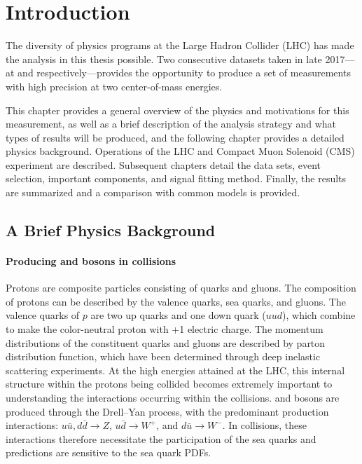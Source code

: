 \chapter{Introduction}

The diversity of physics programs at the Large Hadron Collider (LHC) has made the analysis in this thesis possible. Two consecutive datasets taken in late 2017---at \serag and \serah respectively---provides the opportunity to produce a set of measurements with high precision at two center-of-mass energies.

This chapter provides a general overview of the physics and motivations for this measurement, as well as a brief description of the analysis strategy and what types of results will be produced, and the following chapter provides a detailed physics background. Operations of the LHC and Compact Muon Solenoid (CMS) experiment are described. Subsequent chapters detail the data sets, event selection, important components, and signal fitting method. Finally, the results are summarized and a comparison with common models is provided.


\section{A Brief Physics Background}

\subsubsection{Producing \W and \Z bosons in \pp collisions}
Protons are composite particles consisting of quarks and gluons. The composition of protons can be described by the valence quarks, sea quarks, and gluons. The valence quarks of $p$ are two up quarks and one down quark ($uud$), which combine to make the color-neutral proton with +1 electric charge. The momentum distributions of the constituent quarks and gluons are described by parton distribution function, which have been determined through deep inelastic scattering experiments. At the high energies attained at the LHC, this internal structure within the protons being collided becomes extremely important to understanding the interactions occurring within the \pp collisions. \W and \Z bosons are produced through the Drell--Yan process, with the predominant production interactions: $u\bar{u}, d\bar{d}\rightarrow Z$,  $u\bar{d}\rightarrow W^+$,  and $d\bar{u}\rightarrow W^-$. In \pp collisions, these interactions therefore necessitate the participation of the sea quarks and predictions are sensitive to the sea quark PDFs.

